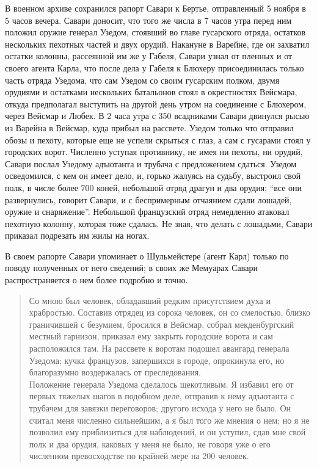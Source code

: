 \documentclass[
  oneside,
  12pt,
  titlepage]{book}
\begin{document}
В военном архиве сохранился рапорт Савари к Бертье, отправленный 5 ноября в 5 часов вечера. Савари доносит, что того же числа в 7 часов утра перед ним положил оружие генерал Узедом, стоявший во главе гусарского отряда, остатков нескольких пехотных частей и двух орудий. Накануне в Варейне, где он захватил остатки колонны, рассеянной им же у Габеля, Савари узнал от пленных и от своего агента Карла, что после дела у Габеля к Блюхеру присоединилась только часть отряда Узедома, что сам Узедом со своим гусарским полком, двумя орудиями и остатками нескольких батальонов стоял в окрестностях Вейсмара, откуда предполагал выступить на другой день утром на соединение с Блюхером, через Вейсмар и Любек. В 2 часа утра с 350 всадниками Савари двинулся рысью из Варейна в Вейсмар, куда прибыл на рассвете. Узедом только что отправил обозы и пехоту, которые еще не успели скрыться с глаз, а сам с гусарами стоял у городских ворот. Численно уступая противнику, не имея ни пехоты, ни орудий, Савари послал Узедому адъютанта и трубача с предложением сдаться. Узедом осведомился, с кем он имеет дело, и, горько жалуясь на судьбу, выстроил свой полк, в числе более 700 коней, небольшой отряд драгун и два орудия; ``все они развернулись, говорит Савари, и с беспримерным отчаянием сдали лошадей, оружие и снаряжение''. Небольшой французский отряд немедленно атаковал пехотную колонну, которая тоже сдалась. Не зная, что делать с лошадьми, Савари приказал подрезать им жилы на ногах.

В своем рапорте Савари упоминает о Шульмейстере (агент Карл) только по поводу полученных от него сведений; в своих же Мемуарах Савари распространяется о нем более подробно и точно.

\begin{quote}
Со мною был человек, обладавший редким присутствием духа и храбростью. Составив отрядец из сорока человек, он со смелостью, близко граничившей с безумием, бросился в Вейсмар, собрал мекденбургский местный гарнизон, приказал ему закрыть городские ворота и сам расположился там. На рассвете к воротам подошел авангард генерала Узедома; кучка французов, запершихся в городе, опрокинула его, но благоразумно воздержалась от преследования.\\
Положение генерала Узедома сделалось щекотливым. Я избавил его от первых тяжелых шагов в подобном деле, отправив к нему адъютанта с трубачем для завязки переговоров; другого исхода у него не было. Он считал меня численно сильнейшим, а я был того же мнения о нем; но я не позволил ему приблизиться для наблюдений, и он уступил, сдав мне свой полк и два орудия, каковых у меня не было, не говоря уже о его численном превосходстве по крайней мере на 200 человек.
\end{quote}
\end{document}
